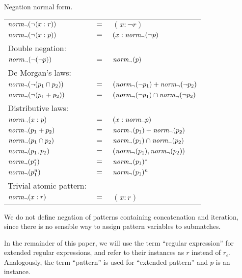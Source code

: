 \begin{defn}
   \label{defn-negnorm}
   Negation normal form.

   \begin{tabular}{lll}
      $\mathit{norm_\neg}(\neg(x : r))$		& $=$	& $(x : \neg r)$					\\
      $\mathit{norm_\neg}(\neg(x : p))$		& $=$	& $(x : \mathit{norm_\neg}(\neg p)$				\\
      Double negation:			&	&							\\
      $\mathit{norm_\neg}(\neg(\neg p))$		& $=$	& $\mathit{norm_\neg}(p)$						\\
      De Morgan's laws:			&	&							\\
      $\mathit{norm_\neg}(\neg(p_1 \cap p_2))$	& $=$	& $(\mathit{norm_\neg}(\neg p_1) + \mathit{norm_\neg}(\neg p_2)$		\\
      $\mathit{norm_\neg}(\neg(p_1 + p_2))$	& $=$	& $(\mathit{norm_\neg}(\neg p_1) \cap \mathit{norm_\neg}(\neg p_2)$		\\
      Distributive laws:		&	&							\\
      $\mathit{norm_\neg}(x : p)$			& $=$	& $(x : \mathit{norm_\neg} p)$					\\
      $\mathit{norm_\neg}(p_1 + p_2)$		& $=$	& $\mathit{norm_\neg}(p_1) + \mathit{norm_\neg}(p_2)$			\\
      $\mathit{norm_\neg}(p_1 \cap p_2)$		& $=$	& $\mathit{norm_\neg}(p_1) \cap \mathit{norm_\neg}(p_2)$			\\
      $\mathit{norm_\neg}(p_1, p_2)$		& $=$	& $(\mathit{norm_\neg}(p_1), \mathit{norm_\neg}(p_2))$			\\
      $\mathit{norm_\neg}(p_1^*)$			& $=$	& $\mathit{norm_\neg}(p_1)^*$					\\
      $\mathit{norm_\neg}(p_1^n)$			& $=$	& $\mathit{norm_\neg}(p_1)^n$					\\
      Trivial atomic pattern:		&	&							\\
      $\mathit{norm_\neg}(x : r)$			& $=$	& $(x : r)$						\\
   \end{tabular}
\end{defn}

We do not define negation of patterns containing concatenation and iteration,
since there is no sensible way to assign pattern variables to submatches.

In the remainder of this paper, we will use the term ``regular expression''
for extended regular expressions, and refer to their instances as $r$ instead
of $r_e$.  Analogously, the term ``pattern'' is used for ``extended pattern''
and $p$ is an instance.

